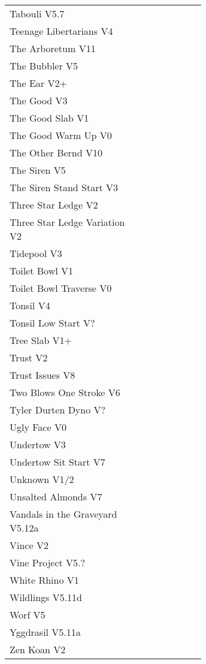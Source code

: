 \begin{flushleft}
\begin{center}
\begin{supertabular}{p{0.65\linewidth}r}
Tabouli V5.7 & \pageref{rt:Tabouli} \\
Teenage Libertarians V4 & \pageref{rt:Teenage Libertarians} \\
The Arboretum V11 & \pageref{rt:The Arboretum} \\
The Bubbler V5 & \pageref{rt:The Bubbler} \\
The Ear V2+ & \pageref{rt:The Ear} \\
The Good V3 & \pageref{rt:The Good} \\
The Good Slab V1 & \pageref{rt:The Good Slab} \\
The Good Warm Up V0 & \pageref{rt:The Good Warm Up} \\
The Other Bernd V10 & \pageref{rt:The Other Bernd} \\
The Siren V5 & \pageref{rt:The Siren} \\
The Siren Stand Start V3 & \pageref{vr:The Siren Stand Start} \\
Three Star Ledge V2 & \pageref{rt:Three Star Ledge} \\
Three Star Ledge Variation V2 & \pageref{vr:Three Star Ledge Variation} \\
Tidepool V3 & \pageref{rt:Tidepool} \\
Toilet Bowl V1 & \pageref{rt:Toilet Bowl} \\
Toilet Bowl Traverse V0 & \pageref{rt:Toilet Bowl Traverse} \\
Tonsil V4 & \pageref{rt:Tonsil} \\
Tonsil Low Start V? & \pageref{vr:Tonsil Low Start} \\
Tree Slab V1+ & \pageref{rt:Tree Slab} \\
Trust V2 & \pageref{rt:Trust} \\
Trust Issues V8 & \pageref{rt:Trust Issues} \\
Two Blows One Stroke V6 & \pageref{rt:Two Blows One Stroke} \\
Tyler Durten Dyno V? & \pageref{vr:Tyler Durten Dyno} \\
Ugly Face V0 & \pageref{rt:Ugly Face} \\
Undertow V3 & \pageref{rt:Undertow} \\
Undertow Sit Start V7 & \pageref{vr:Undertow Sit Start} \\
Unknown V1/2 & \pageref{rt:Unknown} \\
Unsalted Almonds V7 & \pageref{rt:Unsalted Almonds} \\
Vandals in the Graveyard V5.12a & \pageref{rt:Vandals in the Graveyard} \\
Vince V2 & \pageref{rt:Vince} \\
Vine Project V5.? & \pageref{rt:Vine Project} \\
White Rhino V1 & \pageref{rt:White Rhino} \\
Wildlings V5.11d & \pageref{rt:Wildlings} \\
Worf V5 & \pageref{rt:Worf} \\
Yggdrasil V5.11a & \pageref{rt:Yggdrasil} \\
Zen Koan V2 & \pageref{rt:Zen Koan} \\
\end{supertabular}
\end{center}

\end{flushleft}
